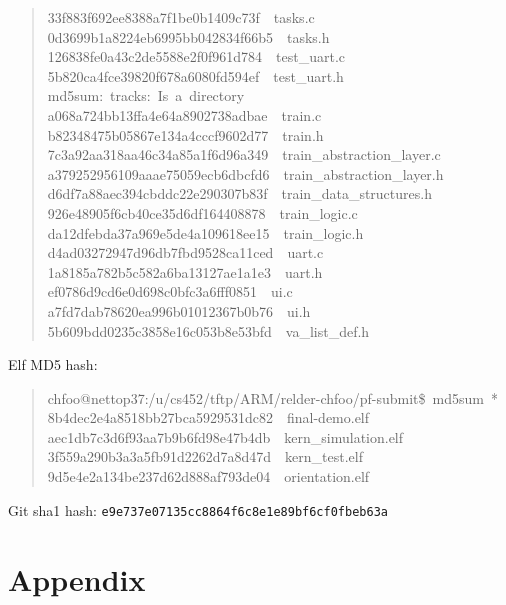 \documentclass[letterpaper]{article}
\begin{document}
\begin{quote}
{33f883f692ee8388a7f1be0b1409c73f~~tasks.c\\
0d3699b1a8224eb6995bb042834f66b5~~tasks.h\\
126838fe0a43c2de5588e2f0f961d784~~test\_uart.c\\
5b820ca4fce39820f678a6080fd594ef~~test\_uart.h\\
md5sum:~tracks:~Is~a~directory\\
a068a724bb13ffa4e64a8902738adbae~~train.c\\
b82348475b05867e134a4cccf9602d77~~train.h\\
7c3a92aa318aa46c34a85a1f6d96a349~~train\_abstraction\_layer.c\\
a379252956109aaae75059ecb6dbcfd6~~train\_abstraction\_layer.h\\
d6df7a88aec394cbddc22e290307b83f~~train\_data\_structures.h\\
926e48905f6cb40ce35d6df164408878~~train\_logic.c\\
da12dfebda37a969e5de4a109618ee15~~train\_logic.h\\
d4ad03272947d96db7fbd9528ca11ced~~uart.c\\
1a8185a782b5c582a6ba13127ae1a1e3~~uart.h\\
ef0786d9cd6e0d698c0bfc3a6fff0851~~ui.c\\
a7fd7dab78620ea996b01012367b0b76~~ui.h\\
5b609bdd0235c3858e16c053b8e53bfd~~va\_list\_def.h
}
\end{quote}

Elf MD5 hash:
%
\begin{quote}{\ttfamily \raggedright \noindent
chfoo@nettop37:/u/cs452/tftp/ARM/relder-chfoo/pf-submit\$~md5sum~*\\
8b4dec2e4a8518bb27bca5929531dc82~~final-demo.elf\\
aec1db7c3d6f93aa7b9b6fd98e47b4db~~kern\_simulation.elf\\
3f559a290b3a3a5fb91d2262d7a8d47d~~kern\_test.elf\\
9d5e4e2a134be237d62d888af793de04~~orientation.elf
}
\end{quote}

Git sha1 hash: \texttt{e9e737e07135cc8864f6c8e1e89bf6cf0fbeb63a}


\section{Appendix%
  \label{appendix}%
}
\end{document}
